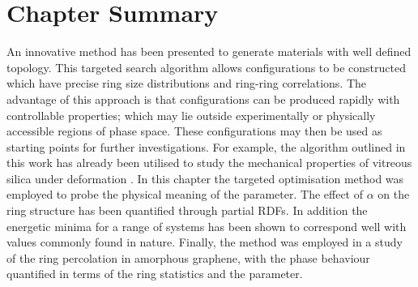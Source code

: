 \section{Chapter Summary}

An innovative method has been presented to generate \td{} materials with well defined topology. 
This targeted \mc{} search algorithm allows configurations to be constructed which have precise ring size distributions and ring\--ring correlations.
The advantage of this approach is that configurations can be produced rapidly with controllable properties; which may lie outside experimentally or physically accessible regions of phase space.
These configurations may then be used as starting points for further investigations.
For example, the algorithm outlined in this work has already been utilised to study the mechanical properties of vitreous silica under deformation \cite{Bamer2020,Ebrahem2020a,Whitaker2019}.
In this chapter the targeted optimisation method was employed to probe the physical meaning of the \aw{} parameter.
The effect of $\alpha$ on the ring structure has been quantified through partial RDFs.
In addition the energetic minima for a range of systems has been shown to correspond well with values commonly found in nature.
Finally, the method was employed in a study of the ring percolation in amorphous graphene, with the phase behaviour quantified in terms of the ring statistics and the \aw{} parameter.

 






